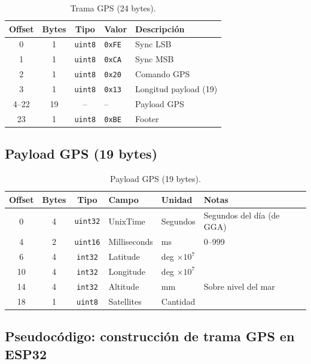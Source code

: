 \documentclass[11pt,a4paper]{article}
\begin{document}
\begin{table}[h]
\centering
\begin{tabular}{@{}cccll@{}}
\toprule
\textbf{Offset} & \textbf{Bytes} & \textbf{Tipo} & \textbf{Valor} & \textbf{Descripción} \\
\midrule
0  & 1 & \texttt{uint8} & \texttt{0xFE}  & Sync LSB \\
1  & 1 & \texttt{uint8} & \texttt{0xCA}  & Sync MSB \\
2  & 1 & \texttt{uint8} & \texttt{0x20}  & Comando GPS \\
3  & 1 & \texttt{uint8} & \texttt{0x13}  & Longitud payload (19) \\
4--22 & 19 & --         & --            & Payload GPS \\
23 & 1 & \texttt{uint8} & \texttt{0xBE}  & Footer \\
\bottomrule
\end{tabular}
\caption{Trama GPS (24 bytes).}
\end{table}

\subsection{Payload GPS (19 bytes)}

\begin{table}[h]
\centering
\begin{tabular}{@{}ccclll@{}}
\toprule
\textbf{Offset} & \textbf{Bytes} & \textbf{Tipo} & \textbf{Campo} & \textbf{Unidad} & \textbf{Notas} \\
\midrule
0  & 4 & \texttt{uint32} & UnixTime     & Segundos      & Segundos del día (de GGA) \\
4  & 2 & \texttt{uint16} & Milliseconds & ms            & 0--999 \\
6  & 4 & \texttt{int32}  & Latitude     & deg $\times 10^7$ & \\
10 & 4 & \texttt{int32}  & Longitude    & deg $\times 10^7$ & \\
14 & 4 & \texttt{int32}  & Altitude     & mm            & Sobre nivel del mar \\
18 & 1 & \texttt{uint8}  & Satellites   & Cantidad      & \\
\bottomrule
\end{tabular}
\caption{Payload GPS (19 bytes).}
\end{table}

\subsection{Pseudocódigo: construcción de trama GPS en ESP32}
\end{document}
